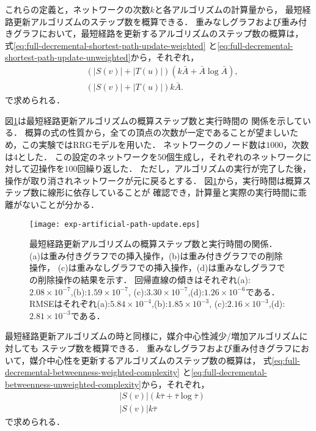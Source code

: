 これらの定義と，ネットワークの次数$k$と各アルゴリズムの計算量から，
最短経路更新アルゴリズムのステップ数を概算できる．
重みなしグラフおよび重み付きグラフにおいて，最短経路を更新するアルゴリズムのステップ数の概算は，
式\eqref{eq:full-decremental-shortest-path-update-weighted}
と\eqref{eq:full-decremental-shortest-path-update-unweighted}から，それぞれ，
\begin{align}
  &(|S(v)|+|T(u)|)(k\bar{A}+\bar{A}\log\bar{A}),
  \label{eq:pred-path-steps-weighted} \\
  &(|S(v)|+|T(u)|)k\bar{A}.
  \label{eq:pred-path-steps-unweighted}
\end{align}
で求められる．

図\ref{fig:exp-artificial-path-update}は最短経路更新アルゴリズムの概算ステップ数と実行時間の
関係を示している．
概算の式の性質から，全ての頂点の次数が一定であることが望ましいため，この実験ではRRGモデルを用いた．
ネットワークのノード数は$1000$，次数は$4$とした．
この設定のネットワークを$50$個生成し，それぞれのネットワークに対して辺操作を$100$回繰り返した．
ただし，アルゴリズムの実行が完了した後，操作が取り消されネットワークが元に戻るとする．
図\ref{fig:exp-artificial-path-update}から，実行時間は概算ステップ数に線形に依存していることが
確認でき，計算量と実際の実行時間に乖離がないことが分かる．

\begin{figure}
  \centering
  \texttt{[image: exp-artificial-path-update.eps]}
  \caption{
    最短経路更新アルゴリズムの概算ステップ数と実行時間の関係．
    (a)は重み付きグラフでの挿入操作，(b)は重み付きグラフでの削除操作，
    (c)は重みなしグラフでの挿入操作，(d)は重みなしグラフでの削除操作の結果を示す．
    回帰直線の傾きはそれぞれ(a):$2.08\times10^{-7}$,(b):$1.59\times10^{-7}$,
    (c):$3.30\times10^{-7}$,(d):$1.26\times10^{-6}$である．
    RMSEはそれぞれ(a):$5.84\times10^{-4}$,(b):$1.85\times10^{-3}$,
    (c):$2.16\times10^{-3}$,(d):$2.81\times10^{-3}$である．
  }
  \label{fig:exp-artificial-path-update}
\end{figure}

最短経路更新アルゴリズムの時と同様に，媒介中心性減少/増加アルゴリズムに対しても
ステップ数を概算できる．
重みなしグラフおよび重み付きグラフにおいて，媒介中心性を更新するアルゴリズムのステップ数の概算は，
式\eqref{eq:full-decremental-betweenness-weighted-complexity}
と\eqref{eq:full-decremental-betweenness-unweighted-complexity}から，それぞれ，
\begin{align}
  &|S(v)|(k\bar{\tau}+\bar{\tau}\log\bar{\tau})
  \label{eq:pred-betw-steps-weighted} \\
  &|S(v)|k\bar{\tau}
  \label{eq:pred-betw-steps-unweighted}
\end{align}
で求められる．

